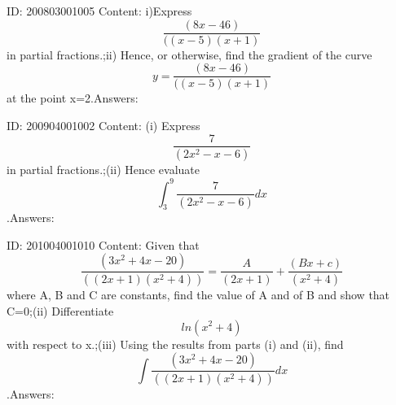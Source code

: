 \documentclass{article}
\begin{document}
ID: 200803001005
Content:
i)Express $$\frac{(8x-46)}{((x-5)(x+1)}$$ in partial fractions.;ii) Hence, or otherwise, find the gradient of the curve $$y=\frac{(8x-46)}{((x-5)(x+1)}$$ at the point x=2.Answers:

ID: 200904001002
Content:
(i) Express $$\frac{7}{(2x^2 -x-6)}$$ in partial fractions.;(ii) Hence evaluate $$\int_3^9 \frac{7}{(2x^2 -x-6)}dx$$.Answers:

ID: 201004001010
Content:
Given that $$\frac{(3x^2+4x-20)}{((2x+1)(x^2+4))} =\frac{A}{(2x+1)} +\frac{(Bx+c)}{(x^2+4)} $$ where A, B and C are constants, find the value of A and of B and show that C=0;(ii) Differentiate $$ln(x^2+4)$$ with respect to x.;(iii) Using the results from parts (i) and (ii), find $$\int\frac{(3x^2+4x-20)}{((2x+1)(x^2+4))} dx$$.Answers:
\end{document}
